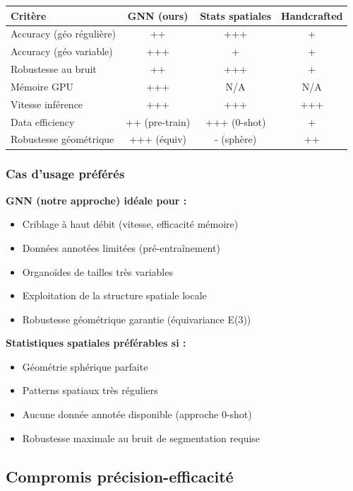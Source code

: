 \begin{center}
\begin{tabular}{|l|c|c|c|}
\hline
\textbf{Critère} & \textbf{GNN (ours)} & \textbf{Stats spatiales} & \textbf{Handcrafted} \\
\hline
Accuracy (géo régulière) & ++ & +++ & + \\
Accuracy (géo variable) & +++ & + & + \\
Robustesse au bruit & ++ & +++ & + \\
Mémoire GPU & +++ & N/A & N/A \\
Vitesse inférence & +++ & +++ & +++ \\
Data efficiency & ++ (pre-train) & +++ (0-shot) & + \\
Robustesse géométrique & +++ (équiv) & - (sphère) & ++ \\
\hline
\end{tabular}
\end{center}

\subsubsection{Cas d'usage préférés}

\textbf{GNN (notre approche) idéale pour :}
\begin{itemize}
    \item Criblage à haut débit (vitesse, efficacité mémoire)
    \item Données annotées limitées (pré-entraînement)
    \item Organoïdes de tailles très variables
    \item Exploitation de la structure spatiale locale
    \item Robustesse géométrique garantie (équivariance E(3))
\end{itemize}

\textbf{Statistiques spatiales préférables si :}
\begin{itemize}
    \item Géométrie sphérique parfaite
    \item Patterns spatiaux très réguliers
    \item Aucune donnée annotée disponible (approche 0-shot)
    \item Robustesse maximale au bruit de segmentation requise
\end{itemize}

\subsection{Compromis précision-efficacité}

